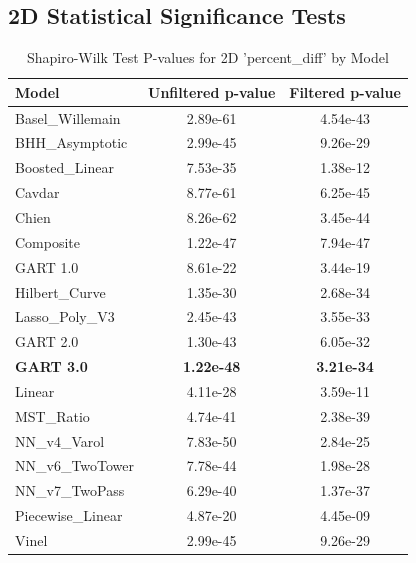 \documentclass[11pt, a4paper]{article}
\begin{document}
\subsection{2D Statistical Significance Tests}

\begin{table}[H]
    \centering
    \caption{Shapiro-Wilk Test P-values for 2D 'percent\_diff' by Model}
    \label{tab:shapiro}
    \begin{tabular}{lS[table-format=1.2e-2]S[table-format=1.2e-2]}
        \toprule
        \textbf{Model} & {\textbf{Unfiltered p-value}} & {\textbf{Filtered p-value}} \\
        \midrule
        Basel\_Willemain & 2.89e-61 & 4.54e-43 \\
        BHH\_Asymptotic & 2.99e-45 & 9.26e-29 \\
        Boosted\_Linear & 7.53e-35 & 1.38e-12 \\
        Cavdar & 8.77e-61 & 6.25e-45 \\
        Chien & 8.26e-62 & 3.45e-44 \\
        Composite & 1.22e-47 & 7.94e-47 \\
        GART 1.0 & 8.61e-22 & 3.44e-19 \\
        Hilbert\_Curve & 1.35e-30 & 2.68e-34 \\
        Lasso\_Poly\_V3 & 2.45e-43 & 3.55e-33 \\
        GART 2.0 & 1.30e-43 & 6.05e-32 \\
        \textbf{GART 3.0} & \textbf{1.22e-48} & \textbf{3.21e-34} \\
        Linear & 4.11e-28 & 3.59e-11 \\
        MST\_Ratio & 4.74e-41 & 2.38e-39 \\
        NN\_v4\_Varol & 7.83e-50 & 2.84e-25 \\
        NN\_v6\_TwoTower & 7.78e-44 & 1.98e-28 \\
        NN\_v7\_TwoPass & 6.29e-40 & 1.37e-37 \\
        Piecewise\_Linear & 4.87e-20 & 4.45e-09 \\
        Vinel & 2.99e-45 & 9.26e-29 \\
        \bottomrule
    \end{tabular}
\end{table}
\end{document}
